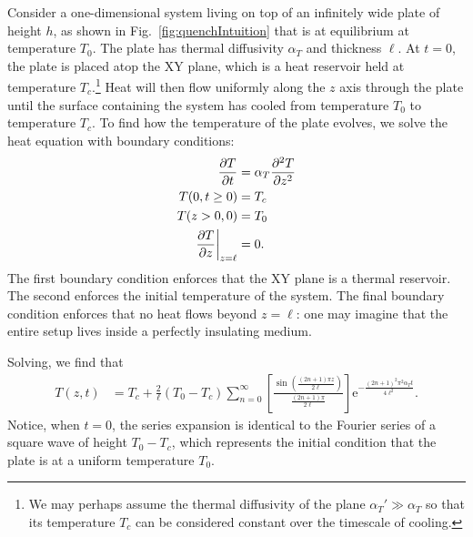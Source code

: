 \documentclass[hyperref={colorlinks=true, urlcolor=blue, citecolor=blue, final, bound}]{sfuthesis}
\newcommand{\e}{\mathrm{e}}
\begin{document}
Consider a one-dimensional system living on top of an infinitely wide plate of height $h$, as shown in Fig.~\ref{fig:quenchIntuition} that is at equilibrium at temperature $T_0$. The plate has thermal diffusivity $\alpha_T$ and thickness $\ell$. At $t=0$, the plate is placed atop the XY plane, which is a heat reservoir held at temperature $T_c$.\footnote{We may perhaps assume the thermal diffusivity of the plane $\alpha_T'\gg \alpha_T$ so that its temperature $T_c$ can be considered constant over the timescale of cooling.} Heat will then flow uniformly along the $z$ axis through the plate until the surface containing the system has cooled from temperature $T_0$ to temperature $T_c$. To find how the temperature of the plate evolves, we solve the heat equation with boundary conditions:
\begin{align}
    \pdv{T}{t} &= \alpha_T\pdv[2]{T}{z}\\
    T(0, t\geq 0) &= T_c\\
    T(z>0, 0) &= T_0\\
    \eval{\pdv{T}{z}}_{z=\ell} &= 0.
\end{align}
The first boundary condition enforces that the XY plane is a thermal reservoir. The second enforces the initial temperature of the system. The final boundary condition enforces that no heat flows beyond $z=\ell$: one may imagine that the entire setup lives inside a perfectly insulating medium. 

Solving, we find that 
\begin{align}
    T(z,t) &= T_c + \frac 2\ell (T_0-T_c)\sum_{n=0}^\infty \left[ \frac{\sin\left( \frac{(2n+1)\pi z}{2\ell} \right)}{\frac{(2n+1)\pi}{2\ell}} \right]\e^{-\frac{(2n+1)^2\pi^2 \alpha_T t}{4\ell^2}}.
\end{align}
Notice, when $t=0$, the series expansion is identical to the Fourier series of a square wave of height $T_0-T_c$, which represents the initial condition that the plate is at a uniform temperature $T_0$.
\end{document}
